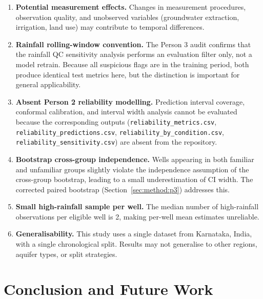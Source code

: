 \documentclass[conference]{IEEEtran}
\begin{document}
\begin{enumerate}
  \item \textbf{Potential measurement effects.} Changes in measurement
        procedures, observation quality, and unobserved variables
        (groundwater extraction, irrigation, land use) may contribute to
        temporal differences.

  \item \textbf{Rainfall rolling-window convention.} The Person 3 audit
        confirms that the rainfall QC sensitivity analysis performs an
        evaluation filter only, not a model retrain.
        Because all suspicious flags are in the training period, both
        produce identical test metrics here, but the distinction is
        important for general applicability.

  \item \textbf{Absent Person 2 reliability modelling.} Prediction interval
        coverage, conformal calibration, and interval width analysis
        cannot be evaluated because the corresponding outputs
        (\texttt{reliability\_metrics.csv},
        \texttt{reliability\_predictions.csv},
        \texttt{reliability\_by\_condition.csv},
        \texttt{reliability\_sensitivity.csv})
        are absent from the repository.

  \item \textbf{Bootstrap cross-group independence.} Wells appearing in
        both familiar and unfamiliar groups slightly violate the
        independence assumption of the cross-group bootstrap, leading to
        a small underestimation of CI width.
        The corrected paired bootstrap (Section~\ref{sec:method:p3})
        addresses this.

  \item \textbf{Small high-rainfall sample per well.}
        The median number of high-rainfall observations per eligible well
        is 2, making per-well mean estimates unreliable.

  \item \textbf{Generalisability.} This study uses a single dataset from
        Karnataka, India, with a single chronological split.
        Results may not generalise to other regions, aquifer types, or
        split strategies.
\end{enumerate}

\section{Conclusion and Future Work}
\label{sec:conclusion}
\end{document}
